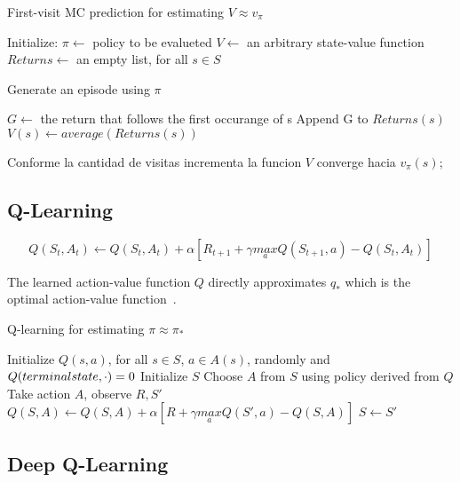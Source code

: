 \documentclass[letterpaper, 10 pt]{IEEEconf}
\begin{document}
\begin{algorithm}
\caption{First-visit MC prediction for estimating $V \approx v_{\pi}$}
\begin{algorithmic}[1]

  \State Initialize:
  \State $\pi \leftarrow$ policy to be evalueted
  \State $V \leftarrow$ an arbitrary state-value function
  \State $Returns \leftarrow$ an empty list, for all $s \in \mathit{S}$

  \State Generate an episode using $\pi$


  \State $G \leftarrow$ the return that follows the first occurange of s
  \State Append G to $Returns(s)$
  \State $V(s) \leftarrow average(Returns(s))$
    \EndFor
    \EndWhile

\end{algorithmic}
\end{algorithm}

Conforme la cantidad de visitas incrementa la funcion $V$ converge hacia $v_\pi(s)$;

\subsection{Q-Learning}


$$
Q (S_t, A_t) \leftarrow Q(S_t, A_t) + \alpha \left[ R_{t+1} + \gamma \underset{a}{max} Q(S_{t+1}, a) - Q(S_t, A_t) \right]
$$

The learned action-value function $Q$ directly approximates $q_*$
which is the optimal action-value function~\cite{sutton2018reinforcement}.


\begin{algorithm}
\caption{Q-learning for estimating $\pi \approx \pi_*$}
\begin{algorithmic}[1]
    \State Initialize $Q(s, a)$, for all $s \in \mathit{S}$, $a \in \mathit{A}(s)$, randomly and $Q(terminal\-state, \cdot)=0$
    \State Initialize $S$
    \State Choose $A$ from $S$ using policy derived from $Q$
    \State Take action $A$, observe $R, S'$
    \State $Q (S, A) \leftarrow Q(S, A) + \alpha \left[ R + \gamma \underset{a}{max} Q(S', a) - Q(S, A) \right]$
    \State $S \leftarrow S'$
    \EndIf
    \EndIf
\end{algorithmic}
\end{algorithm}


\subsection{Deep Q-Learning}
\end{document}
